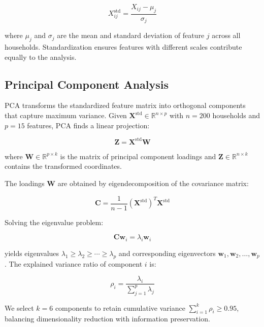 \documentclass[11pt]{article}
\begin{document}
\begin{equation}
X_{ij}^{\text{std}} = \frac{X_{ij} - \mu_j}{\sigma_j}
\end{equation}

where $\mu_j$ and $\sigma_j$ are the mean and standard deviation of feature $j$ across all households. Standardization ensures features with different scales contribute equally to the analysis.

\subsection{Principal Component Analysis}

PCA transforms the standardized feature matrix into orthogonal components that capture maximum variance. Given $\mathbf{X}^{\text{std}} \in \mathbb{R}^{n \times p}$ with $n=200$ households and $p=15$ features, PCA finds a linear projection:

\begin{equation}
\mathbf{Z} = \mathbf{X}^{\text{std}} \mathbf{W}
\end{equation}

where $\mathbf{W} \in \mathbb{R}^{p \times k}$ is the matrix of principal component loadings and $\mathbf{Z} \in \mathbb{R}^{n \times k}$ contains the transformed coordinates.

The loadings $\mathbf{W}$ are obtained by eigendecomposition of the covariance matrix:

\begin{equation}
\mathbf{C} = \frac{1}{n-1} (\mathbf{X}^{\text{std}})^T \mathbf{X}^{\text{std}}
\end{equation}

Solving the eigenvalue problem:

\begin{equation}
\mathbf{C} \mathbf{w}_i = \lambda_i \mathbf{w}_i
\end{equation}

yields eigenvalues $\lambda_1 \geq \lambda_2 \geq \cdots \geq \lambda_p$ and corresponding eigenvectors $\mathbf{w}_1, \mathbf{w}_2, \ldots, \mathbf{w}_p$. The explained variance ratio of component $i$ is:

\begin{equation}
\rho_i = \frac{\lambda_i}{\sum_{j=1}^{p} \lambda_j}
\end{equation}

We select $k=6$ components to retain cumulative variance $\sum_{i=1}^{k} \rho_i \geq 0.95$, balancing dimensionality reduction with information preservation.
\end{document}
